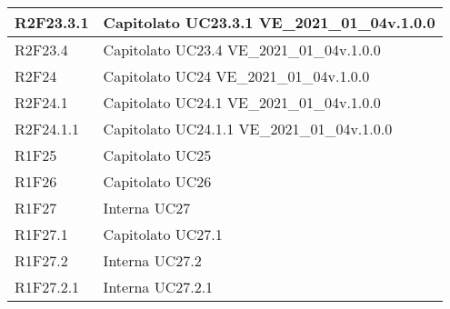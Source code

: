 \begin{center}
\begin{longtable}{|p{22mm}|p{44mm}|}
R2F23.3.1 &
Capitolato \newline
UC23.3.1 \newline
VE\_2021\_01\_04v.1.0.0 \newline
\\
\hline

R2F23.4 &
Capitolato \newline
UC23.4 \newline
VE\_2021\_01\_04v.1.0.0 \newline
\\
\hline

R2F24 &
Capitolato \newline
UC24 \newline
VE\_2021\_01\_04v.1.0.0 \newline
\\
\hline

R2F24.1 &
Capitolato \newline
UC24.1 \newline
VE\_2021\_01\_04v.1.0.0 \newline
\\
\hline

R2F24.1.1 &
Capitolato \newline
UC24.1.1 \newline
VE\_2021\_01\_04v.1.0.0 \newline
\\
\hline

R1F25 &
Capitolato \newline
UC25 \newline
\\
\hline

R1F26 &
Capitolato \newline
UC26 \newline
\\
\hline

R1F27 &
Interna \newline
UC27 \newline
\\
\hline

R1F27.1 &
Capitolato \newline
UC27.1 \newline
\\
\hline

R1F27.2 &
Interna \newline
UC27.2 \newline
\\
\hline

R1F27.2.1 &
Interna \newline
UC27.2.1 \newline
\\
\hline


\end{longtable}
\end{center}
